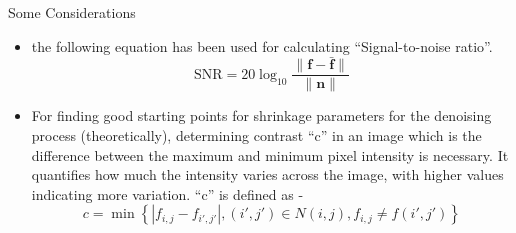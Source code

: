 \documentclass{beamer}
\begin{document}
\begin{frame}{Some Considerations}

    \begin{itemize}
        \item the following equation has been used for calculating ``Signal-to-noise ratio''. 
	\begin{equation}
		\text{SNR} = 20 \log_{10} \frac{\| \mathbf{f} - \bar{\mathbf{f}} \|}{\| \mathbf{n} \|}
	\end{equation}
	
	\item For finding good starting points for shrinkage parameters for the denoising process (theoretically), determining  contrast ``c'' in an image which is the difference between the maximum and minimum pixel intensity is necessary. It quantifies how much the intensity varies across the image, with higher values indicating more variation. ``c'' is defined as - 
	\begin{equation}
		c = \min\left\{\left|f_{i,j} - f_{i',j'}\right|, (i', j') \in N(i, j), f_{i,j} \neq f(i', j')\right\}
	\end{equation}

    \end{itemize}
\end{frame}
\end{document}
